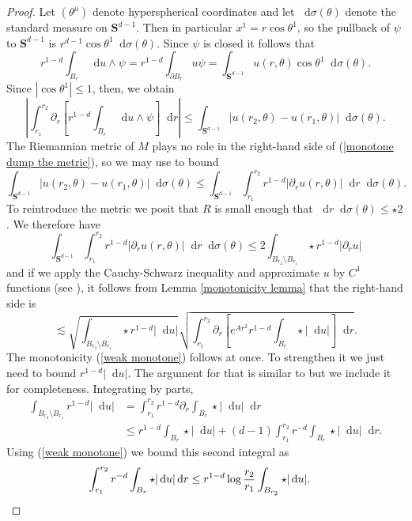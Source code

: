 \documentclass[reqno,12pt,letterpaper]{amsart}
\newcommand{\Sph}{\mathbf S}
\newcommand*\dif{\mathop{}\!\mathrm{d}}
\theoremstyle{definition}
\numberwithin{equation}{section}
\begin{document}
\begin{proof}
Let $(\theta^\mu)$ denote hyperspherical coordinates and let $\dif \sigma(\theta)$ denote the standard measure on $\Sph^{d - 1}$.
Then in particular $x^1 = r \cos \theta^1$, so the pullback of $\psi$ to $\Sph^{d - 1}$ is $r^{d - 1} \cos \theta^1 \dif \sigma(\theta)$.
Since $\psi$ is closed it follows that
$$r^{1 - d} \int_{B_r} \dif u \wedge \psi = r^{1 - d} \int_{\partial B_r} u\psi = \int_{\Sph^{d - 1}} u(r, \theta) \cos \theta^1 \dif \sigma(\theta).$$
Since $|\cos \theta^1| \leq 1$, then, we obtain 
\begin{equation}\label{monotone dump the metric}
\left|\int_{r_1}^{r_2} \partial_r \left[r^{1 - d}\int_{B_r} \dif u \wedge \psi\right] \dif r\right| \leq \int_{\Sph^{d - 1}} |u(r_2, \theta) - u(r_1, \theta)| \dif \sigma(\theta).
\end{equation}
The Riemannian metric of $M$ plays no role in the right-hand side of (\ref{monotone dump the metric}), so we may use \cite[Lemma 5.3]{Giusti77} to bound
$$\int_{\Sph^{d - 1}} |u(r_2, \theta) - u(r_1, \theta)| \dif \sigma(\theta) \leq \int_{\Sph^{d - 1}} \int_{r_1}^{r_2} r^{1 - d}|\partial_r u(r, \theta)| \dif r \dif\sigma(\theta).$$
To reintroduce the metric we posit that $R$ is small enough that $\dif r \dif \sigma(\theta) \leq \star 2$.
We therefore have 
$$\int_{\Sph^{d - 1}} \int_{r_1}^{r_2} r^{1 - d}|\partial_r u(r, \theta)| \dif r \dif\sigma(\theta) \leq 2 \int_{B_{r_2} \setminus B_{r_1}} \star r^{1 - d}|\partial_r u|$$
and if we apply the Cauchy-Schwarz inequality and approximate $u$ by $C^1$ functions (see \cite[pg68]{Giusti77}), it follows from Lemma \ref{monotonicity lemma} that the right-hand side is
$$\lesssim \sqrt{\int_{B_{r_2} \setminus B_{r_1}} \star r^{1 - d} |\dif u|} \sqrt{\int_{r_1}^{r_2} \partial_r \left[e^{Ar^2} r^{1-d}\int_{B_r} \star |\dif u|\right] \dif r}.$$
The monotonicity (\ref{weak monotone}) follows at once. To strengthen it we just need to bound $r^{1 - d} |\dif u|$.
The argument for that is similar to \cite[Lemma 5.11]{Giusti77} but we include it for completeness.
Integrating by parts,
\begin{align*}
\int_{B_{r_2} \setminus B_{r_1}} r^{1 - d} |\dif u| &= \int_{r_1}^{r_2} r^{1 - d} \partial_r \int_{B_r} \star |\dif u| \dif r \\
&\leq r^{1 - d} \int_{B_r} \star |\dif u| + (d - 1) \int_{r_1}^{r_2} r^{-d} \int_{B_r} \star |\dif u| \dif r.
\end{align*}
Using (\ref{weak monotone}) we bound this second integral as 
\begin{align*}
\int_{r_1}^{r_2} r^{-d} \int_{B_r} \star |\dif u| \dif r &\leq r^{1 - d} \log \frac{r_2}{r_1} \int_{B_{r_2}} \star |\dif u|. \qedhere
\end{align*}
\end{proof}
\end{document}
